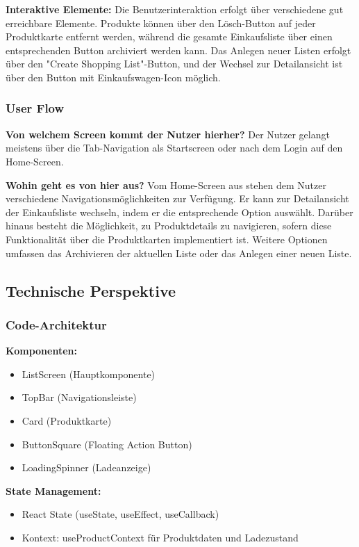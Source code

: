 \documentclass[12pt, a4paper]{report} %
\begin{document}
\noindent\textbf{Interaktive Elemente:}
Die Benutzerinteraktion erfolgt über verschiedene gut erreichbare Elemente. Produkte können über den Lösch-Button auf jeder Produktkarte entfernt werden, während die gesamte Einkaufsliste über einen entsprechenden Button archiviert werden kann. Das Anlegen neuer Listen erfolgt über den "Create Shopping List"-Button, und der Wechsel zur Detailansicht ist über den Button mit Einkaufswagen-Icon möglich.

\subsubsection{User Flow}

\textbf{Von welchem Screen kommt der Nutzer hierher?}
Der Nutzer gelangt meistens über die Tab-Navigation als Startscreen oder nach dem Login auf den Home-Screen.

\noindent\textbf{Wohin geht es von hier aus?}
Vom Home-Screen aus stehen dem Nutzer verschiedene Navigationsmöglichkeiten zur Verfügung. Er kann zur Detailansicht der Einkaufsliste wechseln, indem er die entsprechende Option auswählt. Darüber hinaus besteht die Möglichkeit, zu Produktdetails zu navigieren, sofern diese Funktionalität über die Produktkarten implementiert ist. Weitere Optionen umfassen das Archivieren der aktuellen Liste oder das Anlegen einer neuen Liste.

\subsection{Technische Perspektive}

\subsubsection{Code-Architektur}

\textbf{Komponenten:}
\begin{itemize}
    \item ListScreen (Hauptkomponente)
    \item TopBar (Navigationsleiste)
    \item Card (Produktkarte)
    \item ButtonSquare (Floating Action Button)
    \item LoadingSpinner (Ladeanzeige)
\end{itemize}

\noindent\textbf{State Management:}
\begin{itemize}
    \item React State (useState, useEffect, useCallback)
    \item Kontext: useProductContext für Produktdaten und Ladezustand
\end{itemize}
\end{document}
